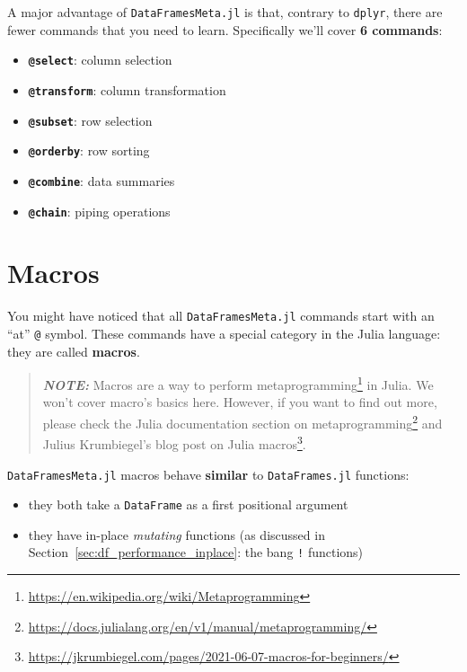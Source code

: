 \documentclass[
  notoc %
]{tufte-book}
\DeclareRobustCommand{\href}[2]{#2\footnote{\url{#1}}}
\providecommand{\tightlist}{%
  \setlength{\itemsep}{0pt}\setlength{\parskip}{0pt}
}
\newcommand{\passthrough}[1]{#1}
\begin{document}
A major advantage of \passthrough{\lstinline!DataFramesMeta.jl!} is
that, contrary to \passthrough{\lstinline!dplyr!}, there are fewer
commands that you need to learn. Specifically we'll cover \textbf{6
commands}:

\begin{itemize}
\tightlist
\item
  \textbf{\passthrough{\lstinline!@select!}}: column selection
\item
  \textbf{\passthrough{\lstinline!@transform!}}: column transformation
\item
  \textbf{\passthrough{\lstinline!@subset!}}: row selection
\item
  \textbf{\passthrough{\lstinline!@orderby!}}: row sorting
\item
  \textbf{\passthrough{\lstinline!@combine!}}: data summaries
\item
  \textbf{\passthrough{\lstinline!@chain!}}: piping operations
\end{itemize}

\hypertarget{sec:dataframesmeta_macros}{%
\section{Macros}\label{sec:dataframesmeta_macros}}

You might have noticed that all
\passthrough{\lstinline!DataFramesMeta.jl!} commands start with an
``at'' \passthrough{\lstinline!@!} symbol. These commands have a special
category in the Julia language: they are called \textbf{macros}.

\begin{quote}
\textbf{\emph{NOTE:}} Macros are a way to perform
\href{https://en.wikipedia.org/wiki/Metaprogramming}{metaprogramming} in
Julia. We won't cover macro's basics here. However, if you want to find
out more, please check the
\href{https://docs.julialang.org/en/v1/manual/metaprogramming/}{Julia
documentation section on metaprogramming} and
\href{https://jkrumbiegel.com/pages/2021-06-07-macros-for-beginners/}{Julius
Krumbiegel's blog post on Julia macros}.
\end{quote}

\passthrough{\lstinline!DataFramesMeta.jl!} macros behave
\textbf{similar} to \passthrough{\lstinline!DataFrames.jl!} functions:

\begin{itemize}
\tightlist
\item
  they both take a \passthrough{\lstinline!DataFrame!} as a first
  positional argument
\item
  they have in-place \emph{mutating} functions (as discussed in
  Section~\ref{sec:df_performance_inplace}: the bang
  \passthrough{\lstinline"!"} functions)
\end{itemize}
\end{document}
